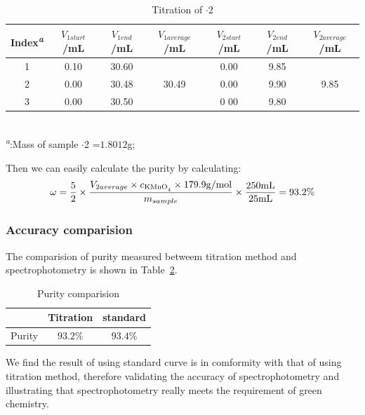 \begin{table}[H]
	\caption{Titration of $\cdot$2}
	\label{tab.Tit}
	\begin{tabular}{ccccccc}
	\toprule
	Index\textsuperscript{\emph{a}}&$V_{1start}$/mL&$V_{1end}$/mL&$V_{1average}$/mL&$V_{2start}$/mL& $V_{2end}$/mL&$V_{2average}$/mL\\
	\midrule
	1    & 0.10 & 30.60 &       & 0.00 & 9.85 &     \\
	2    & 0.00 & 30.48 & 30.49 & 0.00 & 9.90 & 9.85\\
	3    & 0.00 & 30.50 &       & 0 00 & 9.80 &     \\
	\bottomrule
	\end{tabular}\\
	\textsuperscript{\emph{a}}:Mass of sample $\cdot$2 =$1.8012$g;
\end{table}

Then we can easily calculate the purity by calculating: \[\omega=\frac{5}{2}\times\frac{V_{2average}\times c_{\ce{KMnO4}}\times179.9{\rm g/mol}}{m_{sample}}\times\frac{250{\rm mL}}{25{\rm mL}}=93.2\%\]


\subsubsection{Accuracy comparision}
The comparision of purity measured betweem titration method and spectrophotometry is shown in Table~\ref{tab.Res}.

\begin{table}[H]
	\caption{Purity comparision}
	\label{tab.Res}
	\begin{tabular}{ccc}
	\toprule
		   & Titration & standard\\
	\midrule
	Purity & $93.2\%$  & $93.4\%$\\
	\bottomrule
	\end{tabular}
\end{table}

We find the result of using standard curve is in comformity with that of using titration method, therefore validating the accuracy of spectrophotometry and illustrating that spectrophotometry really meets the requirement of green chemistry.

\ifx\SUM\undefined


\fi